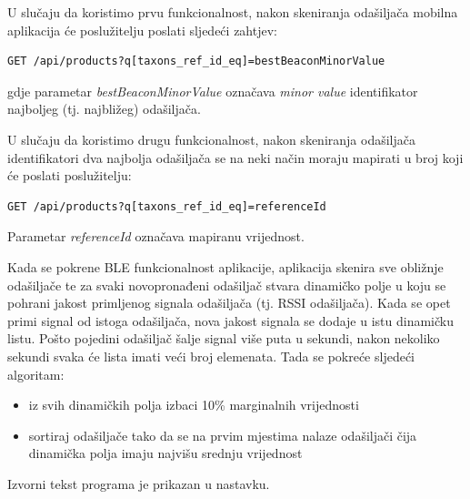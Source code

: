 U slučaju da koristimo prvu funkcionalnost, nakon skeniranja odašiljača mobilna aplikacija će poslužitelju poslati sljedeći zahtjev:
\begin{lstlisting}
GET /api/products?q[taxons_ref_id_eq]=bestBeaconMinorValue
\end{lstlisting}
gdje parametar \textit{bestBeaconMinorValue} označava \textit{minor value} identifikator najboljeg (tj. najbližeg) odašiljača.

U slučaju da koristimo drugu funkcionalnost, nakon skeniranja odašiljača identifikatori dva najbolja odašiljača se na neki način moraju mapirati u broj koji će poslati poslužitelju:
\begin{lstlisting}
GET /api/products?q[taxons_ref_id_eq]=referenceId
\end{lstlisting}
Parametar \textit{referenceId} označava mapiranu vrijednost.

Kada se pokrene BLE funkcionalnost aplikacije, aplikacija skenira sve obližnje odašiljače te za svaki novopronađeni odašiljač stvara dinamičko polje u koju se pohrani jakost primljenog signala odašiljača (tj. RSSI odašiljača). 
Kada se opet primi signal od istoga odašiljača, nova jakost signala se dodaje u istu dinamičku listu. 
Pošto pojedini odašiljač šalje signal više puta u sekundi, nakon nekoliko sekundi svaka će lista imati veći broj elemenata.
Tada se pokreće sljedeći algoritam:
\begin{itemize}
    \item iz svih dinamičkih polja izbaci 10\% marginalnih vrijednosti
    \item sortiraj odašiljače tako da se na prvim mjestima nalaze odašiljači čija dinamička polja imaju najvišu srednju vrijednost
\end{itemize}
Izvorni tekst programa je prikazan u nastavku.

